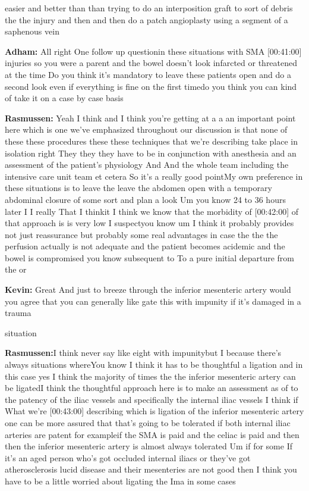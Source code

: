 \documentclass[
]{book}
\begin{document}
easier and better than than trying to do an interposition graft to sort
of debris the the injury and then and then do a patch angioplasty using
a segment of a saphenous vein

\textbf{Adham:} All right One follow up questionin these situations with SMA
{[}00:41:00{]} injuries so you were a parent and the bowel doesn't look
infarcted or threatened at the time Do you think it's mandatory to leave
these patients open and do a second look even if everything is fine on
the first timedo you think you can kind of take it on a case by case
basis

\textbf{Rasmussen:} Yeah I think and I think you're getting at a a an
important point here which is one we've emphasized throughout our
discussion is that none of these these procedures these these techniques
that we're describing take place in isolation right They they they have
to be in conjunction with anesthesia and an assessment of the patient's
physiology And And the whole team including the intensive care unit team
et cetera So it's a really good pointMy own preference in these
situations is to leave the leave the abdomen open with a temporary
abdominal closure of some sort and plan a look Um you know 24 to 36
hours later I I really That I thinkit I think we know that the morbidity
of {[}00:42:00{]} of that approach is is very low I suspectyou know um I
think it probably provides not just reassurance but probably some real
advantages in case the the the perfusion actually is not adequate and
the patient becomes acidemic and the bowel is compromised you know
subsequent to To a pure initial departure from the or

\textbf{Kevin:} Great And just to breeze through the inferior mesenteric
artery would you agree that you can generally like gate this with
impunity if it's damaged in a trauma

situation

\textbf{Rasmussen:}I think never say like eight with impunitybut I because
there's always situations whereYou know I think it has to be thoughtful
a ligation and in this case yes I think the majority of times the the
inferior mesenteric artery can be ligatedI think the thoughtful approach
here is to make an assessment as of to the patency of the iliac vessels
and specifically the internal iliac vessels I think if What we're
{[}00:43:00{]} describing which is ligation of the inferior mesenteric
artery one can be more assured that that's going to be tolerated if both
internal iliac arteries are patent for exampleif the SMA is paid and the
celiac is paid and then then the inferior mesenteric artery is almost
always tolerated Um if for some If it's an aged person who's got
occluded internal iliacs or they've got atherosclerosis lucid disease
and their mesenteries are not good then I think you have to be a little
worried about ligating the Ima in some cases
\end{document}

